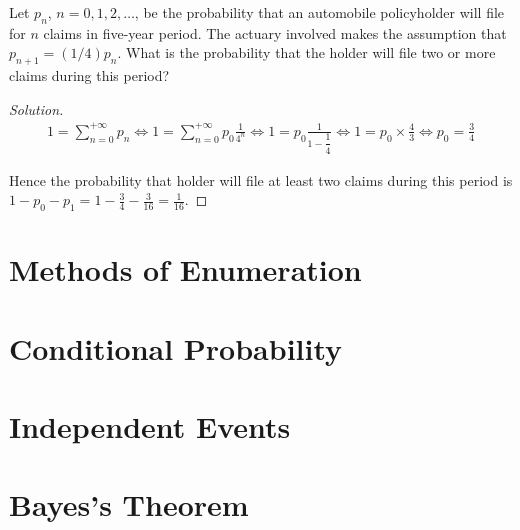 \documentclass[class=probandstats,crop=false]{standalone}
\begin{document}
\begin{exercise}
    \par Let $p_{n}$, $n = 0, 1, 2,\ldots$, be the probability that an automobile policyholder will file for $n$ claims in five-year period. The actuary involved makes the assumption that $p_{n+1} = (1/4)p_{n}$. What is the probability that the holder will file two or more claims during this period?
\end{exercise}

\begin{proof}[Solution]
    \begin{gather*}
        1 = \sum^{+\infty}_{n=0}p_{n}
        \Leftrightarrow 1 = \sum^{+\infty}_{n=0}p_{0}\frac{1}{4^{n}}
        \Leftrightarrow 1 = p_{0}\frac{1}{1 - \dfrac{1}{4}}
        \Leftrightarrow 1 = p_{0}\times\frac{4}{3}
        \Leftrightarrow p_{0} = \frac{3}{4}
    \end{gather*}
    \par Hence the probability that holder will file at least two claims during this period is $1 - p_{0} - p_{1} = 1 - \frac{3}{4} - \frac{3}{16} = \frac{1}{16}$.
\end{proof}


\section{Methods of Enumeration}



\section{Conditional Probability}



\section{Independent Events}



\section{Bayes's Theorem}
\end{document}

